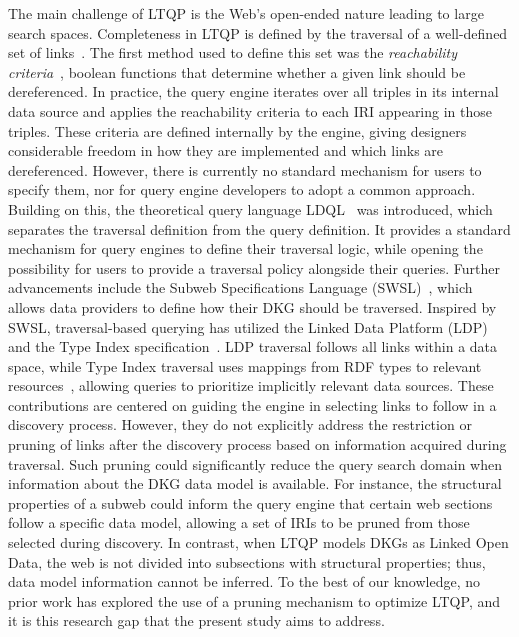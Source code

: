The main challenge of LTQP is the Web's open-ended nature leading to large search spaces.
Completeness in LTQP is defined by the traversal of a well-defined set of links~\cite{Hartig2012}.
The first method used to define this set was the \emph{reachability criteria}~\cite{Hartig2012}, boolean functions that determine whether a given link should be dereferenced. 
In practice, the query engine iterates over all triples in its internal data source and applies the reachability criteria to each IRI appearing in those triples. 
These criteria are defined internally by the engine, giving designers considerable freedom in how they are implemented and which links are dereferenced. 
However, there is currently no standard mechanism for users to specify them, nor for query engine developers to adopt a common approach.
Building on this, the theoretical query language LDQL~\cite{hartigLDQL} was introduced, which separates the traversal definition from the query definition. 
It provides a standard mechanism for query engines to define their traversal logic, while opening the possibility for users to provide a traversal policy alongside their queries.
Further advancements include the Subweb Specifications Language (SWSL)~\cite{Bogaerts2021LinkTW}, which allows data providers to define how their DKG should be traversed.
Inspired by SWSL, traversal-based querying has utilized the Linked Data Platform (LDP) and the Type Index specification~\cite{Taelman2023}.  
LDP traversal follows all links within a data space, while Type Index traversal uses mappings from RDF types to relevant resources~\cite{solidTypeIndexes}, allowing queries to prioritize implicitly relevant data sources.
These contributions are centered on guiding the engine in selecting links to follow in a discovery process.
However, they do not explicitly address the restriction or pruning of links after the discovery process based on information acquired during traversal. 
Such pruning could significantly reduce the query search domain when information about the DKG data model is available. 
For instance, the structural properties of a subweb could inform the query engine that certain web sections follow a specific data model, allowing a set of IRIs to be pruned from those selected during discovery. 
In contrast, when LTQP models DKGs as Linked Open Data, the web is not divided into subsections with structural properties; thus, data model information cannot be inferred. 
To the best of our knowledge, no prior work has explored the use of a pruning mechanism to optimize LTQP, and it is this research gap that the present study aims to address.



